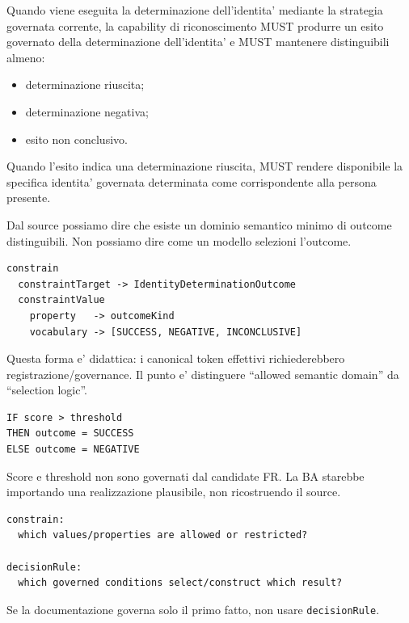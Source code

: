 \documentclass[11pt,a4paper]{article}
\newcommand{\code}[1]{\nolinkurl{#1}}
\begin{document}
\begin{sourcebox}
Quando viene eseguita la determinazione dell'identita' mediante la strategia governata corrente, la capability di riconoscimento MUST produrre un esito governato della determinazione dell'identita' e MUST mantenere distinguibili almeno:

\begin{itemize}
\item determinazione riuscita;
\item determinazione negativa;
\item esito non conclusivo.
\end{itemize}

Quando l'esito indica una determinazione riuscita, MUST rendere disponibile la specifica identita' governata determinata come corrispondente alla persona presente.
\end{sourcebox}

Dal source possiamo dire che esiste un dominio semantico minimo di outcome distinguibili. Non possiamo dire come un modello selezioni l'outcome.

\begin{goodbox}
\begin{lstlisting}
constrain
  constraintTarget -> IdentityDeterminationOutcome
  constraintValue
    property   -> outcomeKind
    vocabulary -> [SUCCESS, NEGATIVE, INCONCLUSIVE]
\end{lstlisting}
Questa forma e' didattica: i canonical token effettivi richiederebbero registrazione/governance. Il punto e' distinguere ``allowed semantic domain'' da ``selection logic''.
\end{goodbox}

\begin{badbox}
\begin{lstlisting}
IF score > threshold
THEN outcome = SUCCESS
ELSE outcome = NEGATIVE
\end{lstlisting}
Score e threshold non sono governati dal candidate FR. La BA starebbe importando una realizzazione plausibile, non ricostruendo il source.
\end{badbox}

\begin{conceptbox}[DISCRIMINATORE]
\begin{lstlisting}
constrain:
  which values/properties are allowed or restricted?

decisionRule:
  which governed conditions select/construct which result?
\end{lstlisting}

Se la documentazione governa solo il primo fatto, non usare \code{decisionRule}.
\end{conceptbox}
\end{document}

